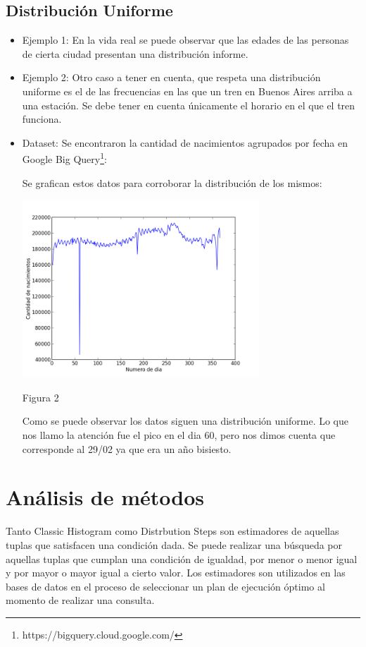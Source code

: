 \documentclass[10pt, a4paper,english,spanish,hidelinks]{article}
\begin{document}
\subsection{Distribución Uniforme}
\begin{itemize}
\item Ejemplo 1: En la vida real se puede observar que las edades de las personas de cierta ciudad presentan una distribución informe. 

\item Ejemplo 2: Otro caso a tener en cuenta, que respeta una distribución uniforme es el de las frecuencias en las que un tren en Buenos Aires arriba a una estación. Se debe tener en cuenta únicamente el horario en el que el tren funciona. 

\item Dataset: Se encontraron la cantidad de nacimientos agrupados por fecha en Google Big Query\footnote{https://bigquery.cloud.google.com/}:


Se grafican estos datos para corroborar la distribución de los mismos:

 \centerline{ \includegraphics[width=0.7\textwidth]{./imagenes/ejemplo_dia_nacimiento.png} } 
  \centerline{Figura 2}

  Como se puede observar los datos siguen una distribución uniforme. Lo que nos 
llamo la atención fue el pico en el dia 60, pero nos dimos cuenta que 
corresponde al 29/02 ya que era un año bisiesto. 

\end{itemize}

\newpage
\section{Análisis de métodos}
Tanto Classic Histogram como Distrbution Steps son estimadores de aquellas tuplas que satisfacen una condición dada. Se puede realizar una búsqueda por aquellas tuplas que cumplan una condición de igualdad, por menor o menor igual y por mayor o mayor igual a cierto valor. Los estimadores son utilizados en las bases de datos en el proceso de seleccionar un plan de ejecución óptimo 
al momento de realizar una consulta.
\end{document}
